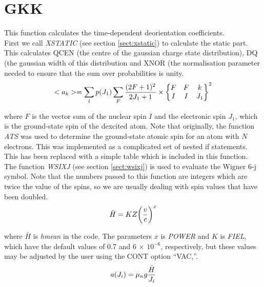 \section{GKK}
\label{sect:gkk}

\noindent This function calculates the time-dependent deorientation
coefficients.\\

\noindent First we call {\em XSTATIC} (see section \ref{sect:xstatic}) to
calculate the static part. This calculates QCEN (the centre of the gaussian
charge state distribution), DQ (the gaussian width of this distribution and
XNOR (the normalisation parameter needed to ensure that the sum over
probabilities is unity.\\

\begin{equation}
<a_k> = \sum_l p(J_1) \sum_F {(2 F + 1)^2 \over 2 J_1 + 1} \times
\begin{Bmatrix}
F & F & k\\
I & I & J_1
\end{Bmatrix}
^2
\end{equation}

\noindent where $F$ is the vector sum of the nuclear spin $I$ and the
electronic spin $J_1$, which is the ground-state spin of the dexcited atom. 
Note that originally, the function {\em ATS} was used to determine the
ground-state atomic spin for an atom with $N$ electrons. This was
implemented as a complicated set of nested if statements. This has been
replaced with a simple table which is included in this function.\\

\noindent The function {\em WSIXJ} (see section \ref{sect:wsixj}) is
used to evaluate the Wigner 6-j symbol. Note that the numbers passed
to this function are integers which are twice the value of the
spins, so we are usually dealing with spin values that have been
doubled.\\

\begin{equation}
\bar{H} = K Z \bigg({v \over c}\bigg)^x
\end{equation}

\noindent where $\bar{H}$ is {\em hmean} in the code. The parameters $x$ is
{\em POWER} and $K$ is {\em FIEL}, which have the default values of 0.7 and
6 $\times$ $10^{-6}$, respectively, but these values may be adjusted by the
user using the CONT option ``VAC,''.\\

\begin{equation}
a(J_i) = \mu_n g {\bar{H} \over J_i}
\end{equation}

